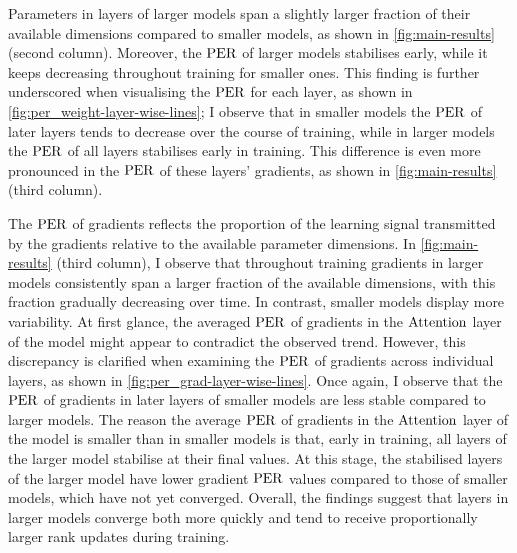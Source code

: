 \begin{result} 
    \label{result:weight-effective-rank} 
    Parameters in layers of larger models span a slightly larger fraction of their available dimensions compared to smaller models, as shown in \cref{fig:main-results} (second column). 
    Moreover, the $\mathrm{PER}$ of larger models stabilises early, while it keeps decreasing throughout training for smaller ones. This finding is further underscored when visualising the $\mathrm{PER}$ for each layer, as shown in \cref{fig:per_weight-layer-wise-lines}; I observe that in smaller models the $\mathrm{PER}$ of later layers tends to decrease over the course of training, while in larger models the $\mathrm{PER}$ of all layers stabilises early in training. This difference is even more pronounced in the $\mathrm{PER}$ of these layers' gradients, as shown in \cref{fig:main-results} (third column).
    \end{result}
    
    \begin{result}
    \label{result}
    The $\mathrm{PER}$ of gradients reflects the proportion of the learning signal transmitted by the gradients relative to the available parameter dimensions. In \cref{fig:main-results} (third column), I observe that throughout training gradients in larger models consistently span a larger fraction of the available dimensions, with this fraction gradually decreasing over time. In contrast, smaller models display more variability. At first glance, the averaged $\mathrm{PER}$ of gradients in the $\mathrm{Attention}$ layer of the \twobil model might appear to contradict the observed trend. However, this discrepancy is clarified when examining the $\mathrm{PER}$ of gradients across individual layers, as shown in \cref{fig:per_grad-layer-wise-lines}. Once again, I observe that the $\mathrm{PER}$ of gradients in later layers of smaller models are less stable compared to larger models. The reason the average $\mathrm{PER}$ of gradients in the $\mathrm{Attention}$ layer of the \twobil model is smaller than in smaller models is that, early in training, all layers of the larger model stabilise at their final values. At this stage, the stabilised layers of the larger model have lower gradient $\mathrm{PER}$ values compared to those of smaller models, which have not yet converged. Overall, the findings suggest that layers in larger models converge both more quickly and tend to receive proportionally larger rank updates during training.
    \end{result}

